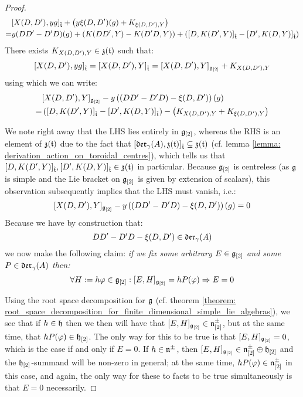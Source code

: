 \begin{proof}
                    $$
                        \begin{aligned}
                            & [ X(D, D') , y g ]_{\hat{\mathfrak{t}}} + \left( y \xi(D, D')(g) + K_{\xi(D, D'), Y} \right)
                            \\
                            = & y (DD' - D'D)( g ) + ( K(DD', Y) - K(D'D, Y) ) + ( [ D, K(D', Y) ]_{\hat{\mathfrak{t}}} - [ D', K(D, Y) ]_{\hat{\mathfrak{t}}} )
                        \end{aligned}
                    $$
                There exists $K_{X(D, D'), Y} \in \mathfrak{z}(\mathfrak{t})$ such that:
                    $$[ X(D, D') , y g ]_{\hat{\mathfrak{t}}} = [ X(D, D') , Y ]_{\hat{\mathfrak{t}}} = [X(D, D'), Y]_{\mathfrak{g}_{[2]}} + K_{X(D, D'), Y}$$
                using which we can write:
                    $$
                        \begin{aligned}
                            & [X(D, D'), Y]_{\mathfrak{g}_{[2]}} - y \left( ( DD' - D'D) - \xi(D, D') \right)( g )
                            \\
                            = & \left( [ D, K(D', Y) ]_{\hat{\mathfrak{t}}} - [ D', K(D, Y) ]_{\hat{\mathfrak{t}}} \right) - \left( K_{X(D, D'), Y} + K_{\xi(D, D'), Y} \right)
                        \end{aligned}
                    $$
                    
                We note right away that the LHS lies entirely in $\mathfrak{g}_{[2]}$, whereas the RHS is an element of $\mathfrak{z}(\mathfrak{t})$ due to the fact that $[\mathfrak{der}_{\gamma}(A), \mathfrak{z}(\mathfrak{t})]_{\hat{\mathfrak{t}}} \subseteq \mathfrak{z}(\mathfrak{t})$ (cf. lemma \ref{lemma: derivation_action_on_toroidal_centres}), which tells us that $[ D, K(D', Y) ]_{\hat{\mathfrak{t}}}, [ D', K(D, Y) ]_{\hat{\mathfrak{t}}} \in \mathfrak{z}(\mathfrak{t})$ in particular. Because $\mathfrak{g}_{[2]}$ is centreless (as $\mathfrak{g}$ is simple and the Lie bracket on $\mathfrak{g}_{[2]}$ is given by extension of scalars), this observation subsequently implies that the LHS must vanish, i.e.:
                    $$[X(D, D'), Y]_{\mathfrak{g}_{[2]}} - y \left( ( DD' - D'D) - \xi(D, D') \right)( g ) = 0$$
                Because we have by construction that:
                    $$DD' - D'D - \xi(D, D') \in \mathfrak{der}_{\gamma}(A)$$
                we now make the following claim: \textit{if we fix some arbitrary $E \in \mathfrak{g}_{[2]}$ and some $P \in \mathfrak{der}_{\gamma}(A)$ then:}
                    $$\forall H := h \varphi \in \mathfrak{g}_{[2]}: [E, H]_{\mathfrak{g}_{[2]}} = h P( \varphi ) \Rightarrow E = 0$$

                Using the root space decomposition for $\mathfrak{g}$ (cf. theorem \ref{theorem: root_space_decomposition_for_finite_dimensional_simple_lie_algebras}), we see that if $h \in \mathfrak{h}$ then we then will have that $[E, H]_{\mathfrak{g}_{[2]}} \in \mathfrak{n}^{\pm}_{[2]}$, but at the same time, that $h P(\varphi) \in \mathfrak{h}_{[2]}$. The only way for this to be true is that $[E, H]_{\mathfrak{g}_{[2]}} = 0$, which is the case if and only if $E = 0$. If $h \in \mathfrak{n}^{\pm}$, then $[E, H]_{\mathfrak{g}_{[2]}} \in \mathfrak{n}^{\pm}_{[2]} \oplus \mathfrak{h}_{[2]}$ and the $\mathfrak{h}_{[2]}$-summand will be non-zero in general; at the same time, $h P(\varphi) \in \mathfrak{n}^{\pm}_{[2]}$ in this case, and again, the only way for these to facts to be true simultaneously is that $E = 0$ necessarily. 


\end{proof}

